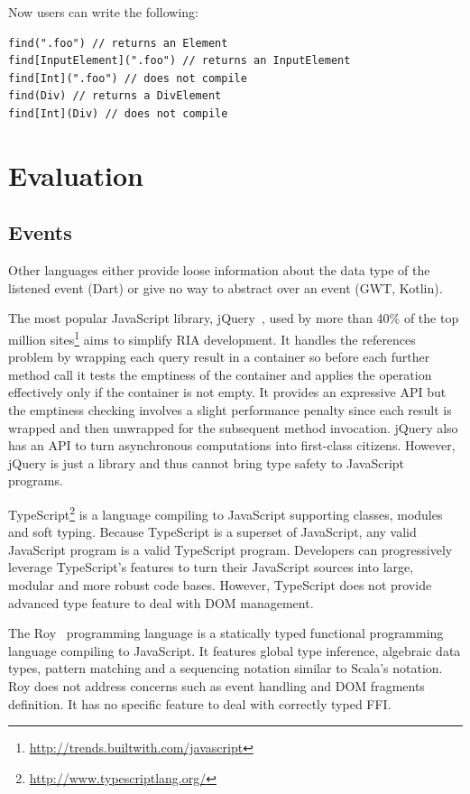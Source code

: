 \documentclass[runningheads,a4paper]{llncs}
\begin{document}
Now users can write the following:

\begin{lstlisting}
find(".foo") // returns an Element
find[InputElement](".foo") // returns an InputElement
find[Int](".foo") // does not compile
find(Div) // returns a DivElement
find[Int](Div) // does not compile
\end{lstlisting}


\section{Evaluation}

\subsection{Events}


Other languages either provide loose information about the data type of the listened event (Dart) or
give no way to abstract over an event (GWT, Kotlin).

The most popular JavaScript library, jQuery~\cite{Bibeault08_jQuery}, used by more than 40\% of the top million
sites\footnote{\href{http://trends.builtwith.com/javascript}{http://trends.builtwith.com/javascript}} aims to
simplify RIA development. It handles the  references problem by wrapping each query result in a container
so before each further method call it tests the emptiness of the container and applies the operation effectively only
if the container is not empty. It provides an expressive API but the emptiness checking involves a slight performance
penalty since each result is wrapped and then unwrapped for the subsequent method invocation. jQuery also has an API
to turn asynchronous computations into first-class citizens. However, jQuery is just a library and thus cannot bring
type safety to JavaScript programs.

TypeScript\footnote{\href{http://www.typescriptlang.org/}{http://www.typescriptlang.org/}} is a language compiling to
JavaScript supporting classes, modules and soft typing. Because TypeScript is a superset of JavaScript, any valid
JavaScript program is a valid TypeScript program. Developers can progressively leverage TypeScript’s features to turn
their JavaScript sources into large, modular and more robust code bases. However, TypeScript does not provide advanced type feature to deal with DOM management.

The Roy~\cite{McKenna_Roy} programming language is a statically typed functional programming language compiling to
JavaScript. It features global type inference, algebraic data types, pattern matching and a sequencing notation
similar to Scala’s  notation. Roy does not address concerns such as event handling and DOM fragments
definition. It has no specific feature to deal with correctly typed FFI. 
\end{document}

